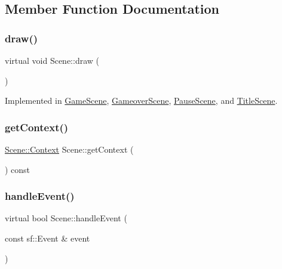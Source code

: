 \subsection{Member Function Documentation}
\mbox{\label{class_scene_a789c16961aa1e316b2a4a05b95187546}} 
\subsubsection{\texorpdfstring{draw()}{draw()}}
{\footnotesize\ttfamily virtual void Scene\+::draw (\begin{DoxyParamCaption}{ }\end{DoxyParamCaption})\hspace{0.3cm}{\ttfamily [pure virtual]}}



Implemented in \hyperlink{class_game_scene_ae9eb60cbb8fa55eeb07b951e3d83f426}{Game\+Scene}, \hyperlink{class_gameover_scene_ae8a5e79e002d0e79edaec9ec1b0df902}{Gameover\+Scene}, \hyperlink{class_pause_scene_abfd1398a064a83b3ae6ac5fd98aebf05}{Pause\+Scene}, and \hyperlink{class_title_scene_a3e527255771f75a41c4fe8aaa35999dd}{Title\+Scene}.

\mbox{\label{class_scene_acab4ecf24b21ffa8e423a8e4fd45c491}} 
\subsubsection{\texorpdfstring{get\+Context()}{getContext()}}
{\footnotesize\ttfamily \hyperlink{struct_scene_1_1_context}{Scene\+::\+Context} Scene\+::get\+Context (\begin{DoxyParamCaption}{ }\end{DoxyParamCaption}) const\hspace{0.3cm}{\ttfamily [protected]}}

\mbox{\label{class_scene_af25e4d2c998aca4e95899fb67488e815}} 
\subsubsection{\texorpdfstring{handle\+Event()}{handleEvent()}}
{\footnotesize\ttfamily virtual bool Scene\+::handle\+Event (\begin{DoxyParamCaption}\item[{const sf\+::\+Event \&}]{event }\end{DoxyParamCaption})\hspace{0.3cm}{\ttfamily [pure virtual]}}



